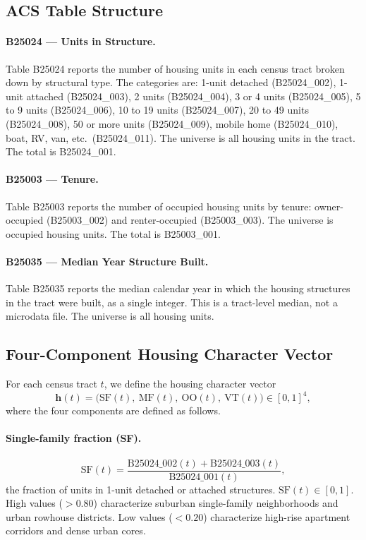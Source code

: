 \label{sec:algorithm}

\subsection{ACS Table Structure}

\paragraph{B25024 --- Units in Structure.}
Table B25024 reports the number of housing units in each census tract broken
down by structural type.
The categories are:
1-unit detached (B25024\_002),
1-unit attached (B25024\_003),
2 units (B25024\_004),
3 or 4 units (B25024\_005),
5 to 9 units (B25024\_006),
10 to 19 units (B25024\_007),
20 to 49 units (B25024\_008),
50 or more units (B25024\_009),
mobile home (B25024\_010),
boat, RV, van, etc.\ (B25024\_011).
The universe is all housing units in the tract.
The total is B25024\_001.

\paragraph{B25003 --- Tenure.}
Table B25003 reports the number of occupied housing units by tenure:
owner-occupied (B25003\_002) and renter-occupied (B25003\_003).
The universe is occupied housing units.
The total is B25003\_001.

\paragraph{B25035 --- Median Year Structure Built.}
Table B25035 reports the median calendar year in which the housing structures
in the tract were built, as a single integer.
This is a tract-level median, not a microdata file.
The universe is all housing units.

\subsection{Four-Component Housing Character Vector}

For each census tract $t$, we define the housing character vector
\begin{equation}
  \mathbf{h}(t) = \bigl(\mathrm{SF}(t),\ \mathrm{MF}(t),\ \mathrm{OO}(t),\ \mathrm{VT}(t)\bigr)
  \in [0,1]^4,
  \label{eq:housingvec}
\end{equation}
where the four components are defined as follows.

\paragraph{Single-family fraction (SF).}
\begin{equation}
  \mathrm{SF}(t) = \frac{\text{B25024\_002}(t) + \text{B25024\_003}(t)}{\text{B25024\_001}(t)},
  \label{eq:sf}
\end{equation}
the fraction of units in 1-unit detached or attached structures.
$\mathrm{SF}(t) \in [0,1]$.
High values ($> 0.80$) characterize suburban single-family neighborhoods and
urban rowhouse districts.
Low values ($< 0.20$) characterize high-rise apartment corridors and
dense urban cores.

